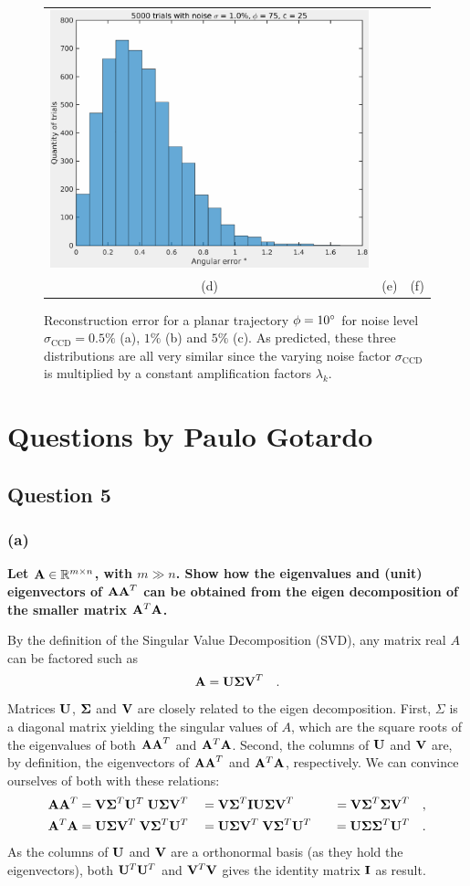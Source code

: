 \documentclass{report}
\begin{document}
\begin{figure}
\begin{tabular}{ccc}
  \includegraphics[width=0.30\linewidth]{q4_error_el_75_dev_25_noise_0_010000.pdf} \\
  (d) &
  (e) &
  (f) 
  \end{tabular}
  \caption[Reconstruction error with $\phi = 10\degree$.]
   {Reconstruction error for a planar trajectory $\phi = 10\degree$ for noise level $\sigma_\text{CCD} = 0.5\%$ (a), $1\%$ (b) and $5\%$ (c). As predicted, these three distributions are all very similar since the varying noise factor $\sigma_\text{CCD}$ is multiplied by a constant amplification factors $\lambda_k$.}
  \label{q4:recons_err}
\end{figure}

\chapter{Questions by Paulo Gotardo}

\section{Question 5}
\subsection{(a)}
\textbf{Let $\mathbf{A} \in \mathbb{R}^{m \times n}$, with $m \gg n$. Show how the eigenvalues and (unit) eigenvectors of $\mathbf{AA}^T$ can be obtained from the eigen decomposition of the smaller matrix $\mathbf{A}^T\mathbf{A}$.}

By the definition of the Singular Value Decomposition (SVD), any matrix real $A$ can be factored such as
\begin{equation}
\mathbf{A} = \mathbf{U \Sigma V}^T \quad.
\end{equation}
Matrices $\mathbf{U}$, $\mathbf{\Sigma}$ and $\mathbf{V}$ are closely related to the eigen decomposition. First, $\Sigma$ is a diagonal matrix yielding the singular values of $A$, which are the square roots of the eigenvalues of both $\mathbf{AA}^T$ and $\mathbf{A}^T\mathbf{A}$. Second, the columns of $\mathbf{U}$ and $\mathbf{V}$ are, by definition, the eigenvectors of $\mathbf{AA}^T$ and $\mathbf{A}^T\mathbf{A}$, respectively. We can convince ourselves of both with these relations:
\begin{align*}
\mathbf{AA}^T           &= \mathbf{V\Sigma}^T\mathbf{U}^T \; \mathbf{U\Sigma V}^T
                        &&= \mathbf{V\Sigma}^T\mathbf{IU\Sigma V}^T 
                        &&&= \mathbf{V\Sigma}^T\mathbf{\Sigma V}^T \quad,\\
\mathbf{A}^T\mathbf{A}  &= \mathbf{U\Sigma V}^T \; \mathbf{V\Sigma}^T\mathbf{U}^T
                        &&= \mathbf{U\Sigma V}^T \; \mathbf{V\Sigma}^T\mathbf{U}^T
                        &&&= \mathbf{U\Sigma}\mathbf{\Sigma}^T\mathbf{U}^T \quad.
\end{align*}
As the columns of $\mathbf{U}$ and $\mathbf{V}$ are a orthonormal basis (as they hold the eigenvectors), both $\mathbf{U}^T\mathbf{U}^T$ and $\mathbf{V}^T\mathbf{V}$ gives the identity matrix $\mathbf{I}$ as result.
\end{document}
